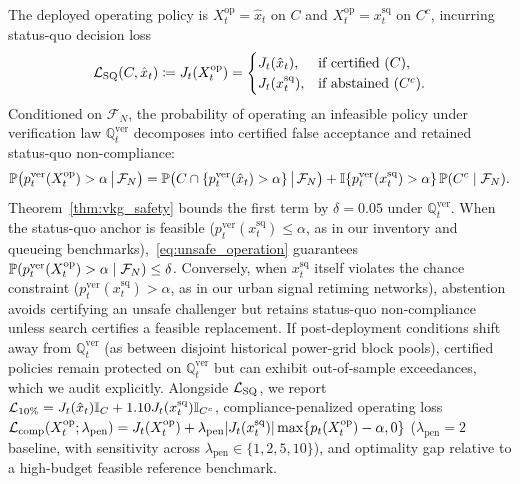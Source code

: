 The deployed operating policy is $X_t^{\mathrm{op}} = \hat{x}_t$ on $C$ and $X_t^{\mathrm{op}} = x_t^{\mathrm{sq}}$ on $C^c$, incurring status-quo decision loss
\begin{equation}\label{eq:sq_loss}
  \mathcal{L}_{\mathrm{SQ}}(C, \hat{x}_t) \coloneqq J_t(X_t^{\mathrm{op}}) =
  \begin{cases}
    J_t(\hat{x}_t), & \text{if certified } (C), \\
    J_t(x_t^{\mathrm{sq}}), & \text{if abstained } (C^c).
  \end{cases}
\end{equation}
Conditioned on $\mathcal{F}_N$, the probability of operating an infeasible policy under verification law $\mathbb{Q}_t^{\mathrm{ver}}$ decomposes into certified false acceptance and retained status-quo non-compliance:
\begin{equation}\label{eq:unsafe_operation}
  \mathbb{P}\big(p_t^{\mathrm{ver}}(X_t^{\mathrm{op}}) > \alpha \,\big|\, \mathcal{F}_N\big)
  = \mathbb{P}\big(C \cap \{p_t^{\mathrm{ver}}(\hat{x}_t) > \alpha\} \,\big|\, \mathcal{F}_N\big)
  + \mathbb{I}\{p_t^{\mathrm{ver}}(x_t^{\mathrm{sq}}) > \alpha\}\,\mathbb{P}(C^c \mid \mathcal{F}_N).
\end{equation}
Theorem~\ref{thm:vkg_safety} bounds the first term by $\delta = 0.05$ under $\mathbb{Q}_t^{\mathrm{ver}}$. When the status-quo anchor is feasible ($p_t^{\mathrm{ver}}(x_t^{\mathrm{sq}}) \le \alpha$, as in our inventory and queueing benchmarks),~\eqref{eq:unsafe_operation} guarantees $\mathbb{P}(p_t^{\mathrm{ver}}(X_t^{\mathrm{op}}) > \alpha \mid \mathcal{F}_N) \le \delta$. Conversely, when $x_t^{\mathrm{sq}}$ itself violates the chance constraint ($p_t^{\mathrm{ver}}(x_t^{\mathrm{sq}}) > \alpha$, as in our urban signal retiming networks), abstention avoids certifying an unsafe challenger but retains status-quo non-compliance unless search certifies a feasible replacement. If post-deployment conditions shift away from $\mathbb{Q}_t^{\mathrm{ver}}$ (as between disjoint historical power-grid block pools), certified policies remain protected on $\mathbb{Q}_t^{\mathrm{ver}}$ but can exhibit out-of-sample exceedances, which we audit explicitly. Alongside $\mathcal{L}_{\mathrm{SQ}}$, we report $\mathcal{L}_{10\%} = J_t(\hat{x}_t)\mathbb{I}_C + 1.10 J_t(x_t^{\mathrm{sq}})\mathbb{I}_{C^c}$, compliance-penalized operating loss $\mathcal{L}_{\mathrm{comp}}(X_t^{\mathrm{op}}; \lambda_{\mathrm{pen}}) = J_t(X_t^{\mathrm{op}}) + \lambda_{\mathrm{pen}}|J_t(x_t^{\mathrm{sq}})|\max\{p_t(X_t^{\mathrm{op}}) - \alpha, 0\}$ ($\lambda_{\mathrm{pen}} = 2$ baseline, with sensitivity across $\lambda_{\mathrm{pen}} \in \{1, 2, 5, 10\}$), and optimality gap relative to a high-budget feasible reference benchmark.

